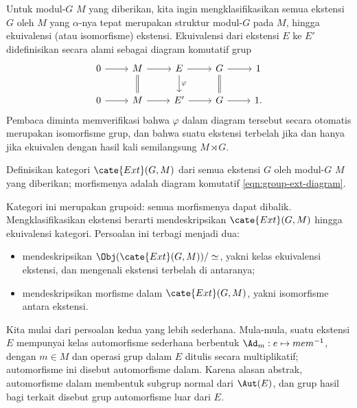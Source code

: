 Untuk modul-$G$ $M$ yang diberikan, kita ingin mengklasifikasikan semua
ekstensi $G$ oleh $M$ yang $\alpha$-nya tepat merupakan struktur modul-$G$
pada $M$, hingga ekuivalensi (atau isomorfisme) ekstensi. Ekuivalensi dari
ekstensi $E$ ke $E'$ didefinisikan secara alami sebagai diagram komutatif grup
\begin{equation}\label{eqn:group-ext-diagram}\begin{tikzcd}
	0 \arrow[r] & M \arrow[r] \arrow[equal,d] &
	E \arrow[r] \arrow[d,"\varphi"] & G \arrow[r] \arrow[equal,d] & 1 \\
	0 \arrow[r] & M \arrow[r] & E' \arrow[r] & G \arrow[r] & 1.
\end{tikzcd}\end{equation}
Pembaca diminta memverifikasi bahwa $\varphi$ dalam diagram tersebut secara
otomatis merupakan isomorfisme grup, dan bahwa suatu ekstensi terbelah jika
dan hanya jika ekuivalen dengan hasil kali semilangsung $M\rtimes G$.

\begin{definition}
	Definisikan kategori $\cate{Ext}(G,M)$ dari semua ekstensi $G$ oleh modul-$G$
	$M$ yang diberikan; morfismenya adalah diagram komutatif
	\eqref{eqn:group-ext-diagram}.
\end{definition}

Kategori ini merupakan grupoid: semua morfismenya dapat dibalik.
Mengklasifikasikan ekstensi berarti mendeskripsikan $\cate{Ext}(G,M)$ hingga
ekuivalensi kategori. Persoalan ini terbagi menjadi dua:
\begin{itemize}
	\item mendeskripsikan $\Obj(\cate{Ext}(G,M))/\simeq$, yakni kelas
	ekuivalensi ekstensi, dan mengenali ekstensi terbelah di antaranya;
	\item mendeskripsikan morfisme dalam $\cate{Ext}(G,M)$, yakni isomorfisme
	antara ekstensi.
\end{itemize}
Kita mulai dari persoalan kedua yang lebih sederhana. Mula-mula, suatu
ekstensi $E$ mempunyai kelas automorfisme sederhana berbentuk
$\Ad_m:e\mapsto mem^{-1}$, dengan $m\in M$ dan operasi grup dalam $E$ ditulis
secara multiplikatif; automorfisme ini disebut automorfisme dalam. Karena
alasan abstrak, automorfisme dalam membentuk subgrup normal dari $\Aut(E)$,
dan grup hasil bagi terkait disebut grup automorfisme luar dari $E$.

